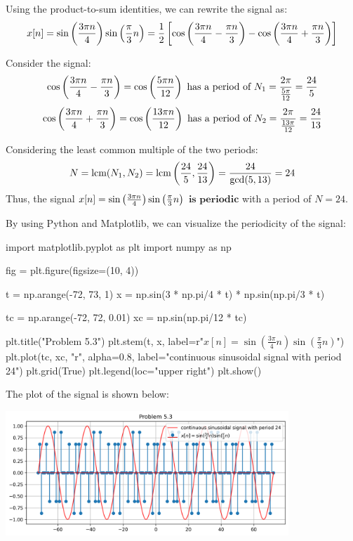 \documentclass[a4paper, 10pt]{article}
\begin{document}
\begin{solution}
Using the product-to-sum identities, we can rewrite the signal as:
\[
    x[n] = \sin \left( \frac{3\pi n}{4} \right)\sin\left( \frac{\pi}{3}n \right) = \frac{1}{2} \left[ \cos \left( \frac{3\pi n}{4} - \frac{\pi n}{3} \right) - \cos \left( \frac{3\pi n}{4} + \frac{\pi n}{3} \right) \right]
\]

Consider the signal:
\[
    \cos \left( \frac{3\pi n}{4} - \frac{\pi n}{3} \right) = \cos \left( \frac{5\pi n}{12} \right) \text{ has a period of } N_1 = \frac{2\pi}{\frac{5\pi}{12}} = \frac{24}{5}
\]
\[
    \cos \left( \frac{3\pi n}{4} + \frac{\pi n}{3} \right) = \cos \left( \frac{13\pi n}{12} \right) \text{ has a period of } N_2 = \frac{2\pi}{\frac{13\pi}{12}} = \frac{24}{13}
\]

Considering the least common multiple of the two periods:
\[
    N = \text{lcm}(N_1, N_2) = \text{lcm}\left(\frac{24}{5}, \frac{24}{13}\right) = \frac{24}{\text{gcd}(5, 13)} = 24
\]
Thus, the signal \( x[n] = \sin \left( \frac{3\pi n}{4} \right)\sin\left( \frac{\pi}{3}n \right) \) \( \boxed{\textbf{is periodic}} \) with a period of \( \boxed{N = 24} \).

\vspace{5mm}

By using Python and Matplotlib, we can visualize the periodicity of the signal:
\begin{codingbox}
import matplotlib.pyplot as plt
import numpy as np

fig = plt.figure(figsize=(10, 4))

t = np.arange(-72, 73, 1)
x = np.sin(3 * np.pi/4 * t) * np.sin(np.pi/3 * t)

tc = np.arange(-72, 72, 0.01)
xc = np.sin(np.pi/12 * tc)

plt.title("Problem 5.3")
plt.stem(t, x, label=r"$x[n] = \sin(\frac{3\pi}{4}n) \sin(\frac{\pi}{3}n)$")
plt.plot(tc, xc, "r", alpha=0.8, label="continuous sinusoidal signal with period 24")
plt.grid(True)
plt.legend(loc="upper right")
plt.show()
\end{codingbox}

The plot of the signal is shown below:
\begin{center}
    \includegraphics[width=0.8\textwidth]{images/problem_5_3.png}
\end{center}
\end{solution}
\end{document}
